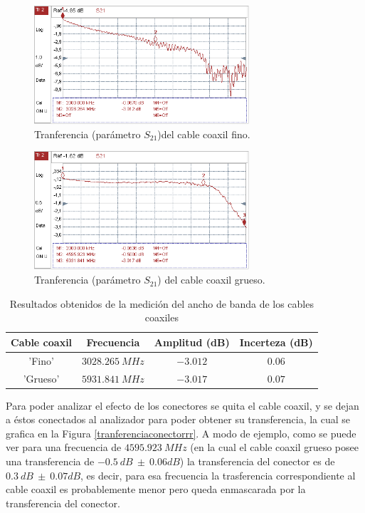 \documentclass[a4paper,10pt]{article}
\begin{document}
		\begin{figure}[!htb]
			\centering
			\includegraphics[width=8cm]
			{Imagenes/transferenciacablefino.png}
			\caption{Tranferencia (par\'ametro $S_{21}$)del cable coaxil 
			fino.}
			\label{caoxilflaco} 
		\end{figure}
		

		\begin{figure}[!htb]
			\centering
			\includegraphics[width=8cm]
			{Imagenes/transferenciacablegroso.png}
			\caption{Tranferencia (par\'ametro $S_{21}$) del cable coaxil 
			grueso.}
			\label{coaxilgordo} 
		\end{figure}
		
	\begin{table}[!htp]
			\centering
			\begin{tabular}{|c|c|c|c|}
				\hline
			Cable coaxil	& Frecuencia & Amplitud (dB) & Incerteza (dB)\\
				\hline
			'Fino'	 &$3028.265~MHz$ & $-3.012$ & $0.06$ \\
			'Grueso' &$5931.841~MHz$ & $-3.017$ & $0.07$ \\				
			\end{tabular}
			\caption{Resultados obtenidos de la medici\'on del ancho de banda de los cables coaxiles} \label{puta}
		\end{table}	
		
		\indent Para poder analizar el efecto de los conectores se quita el 
		cable coaxil, y se dejan a \'estos conectados al analizador para poder 
		obtener su transferencia, la cual se grafica en la Figura 
		\ref{tranferenciaconectorrr}. A modo de ejemplo, como se puede ver para una frecuencia de $4595.923~MHz$ (en la cual el cable coaxil grueso posee una transferencia de $-0.5~dB~\pm~0.06dB$) la transferencia del conector es de $0.3~dB~\pm~0.07dB$, es decir, para esa frecuencia la trasferencia correspondiente al cable coaxil es probablemente menor pero queda enmascarada por la transferencia del conector. 
		
\end{document}
